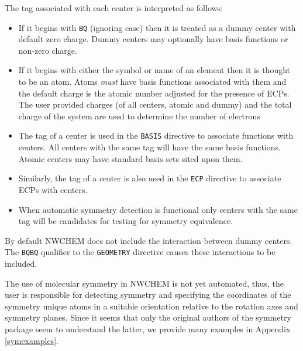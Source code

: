 The tag associated with each center is interpreted as follows:
\begin{itemize}
\item If it begins with \verb+BQ+ (ignoring case) then it is treated
      as a dummy center with default zero charge. Dummy centers may 
      optionally have basis functions or non-zero charge.
\item If it begins with either the symbol or name of an element then
      it is thought to be an atom.  Atoms {\em must} have basis
      functions associated with them and the default charge is the
      atomic number adjusted for the presence of ECPs.  The user
      provided charges (of all centers, atomic and dummy) and the
      total charge of the system are used to determine the number of
      electrons
\item The tag of a center is used in the \verb+BASIS+ directive to
      associate functions with centers.  All centers with the same tag
      will have the same basis functions.  Atomic centers may have
      standard basis sets sited upon them.
\item Similarly, the tag of a center is also used in the \verb+ECP+
      directive to associate ECPs with centers.
\item When automatic symmetry detection is functional only centers
      with the same tag will be candidates for testing for symmetry
      equivalence.
\end{itemize}

By default NWCHEM does not include the interaction between dummy
centers.  The \verb+BQBQ+ qualifier to the \verb+GEOMETRY+ directive
causes these interactions to be included.

 The use of molecular symmetry in NWCHEM is not yet automated, thus,
the user is responsible for detecting symmetry and specifying the
coordinates of the symmetry unique atoms in a suitable orientation
relative to the rotation axes and symmetry planes.  Since it seems
that only the original authors of the symmetry package seem to
understand the latter, we provide many examples in Appendix
\ref{symexamples}.

